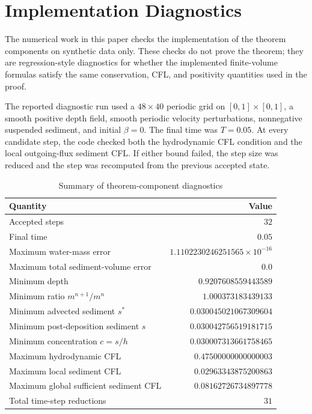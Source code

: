 \section{Implementation Diagnostics}

The numerical work in this paper checks the implementation of the theorem components on synthetic data only. These checks do not prove the theorem; they are regression-style diagnostics for whether the implemented finite-volume formulas satisfy the same conservation, CFL, and positivity quantities used in the proof.

The reported diagnostic run used a \(48\times40\) periodic grid on \([0,1]\times[0,1]\), a smooth positive depth field, smooth periodic velocity perturbations, nonnegative suspended sediment, and initial \(\beta=0\). The final time was \(T=0.05\). At every candidate step, the code checked both the hydrodynamic CFL condition and the local outgoing-flux sediment CFL. If either bound failed, the step size was reduced and the step was recomputed from the previous accepted state.

\begin{table}[H]
\centering
\caption{Summary of theorem-component diagnostics}
\begin{tabular}{lr}
\toprule
Quantity & Value \\
\midrule
Accepted steps & \(32\) \\
Final time & \(0.05\) \\
Maximum water-mass error & \(1.1102230246251565\times 10^{-16}\) \\
Maximum total sediment-volume error & \(0.0\) \\
Minimum depth & \(0.9207608559443589\) \\
Minimum ratio \(m^{n+1}/m^n\) & \(1.000373183439133\) \\
Minimum advected sediment \(s^*\) & \(0.030045021067309604\) \\
Minimum post-deposition sediment \(s\) & \(0.030042756519181715\) \\
Minimum concentration \(c=s/h\) & \(0.030007313661758465\) \\
Maximum hydrodynamic CFL & \(0.47500000000000003\) \\
Maximum local sediment CFL & \(0.02963343875200863\) \\
Maximum global sufficient sediment CFL & \(0.08162726734897778\) \\
Total time-step reductions & \(31\) \\
\bottomrule
\end{tabular}
\end{table}

